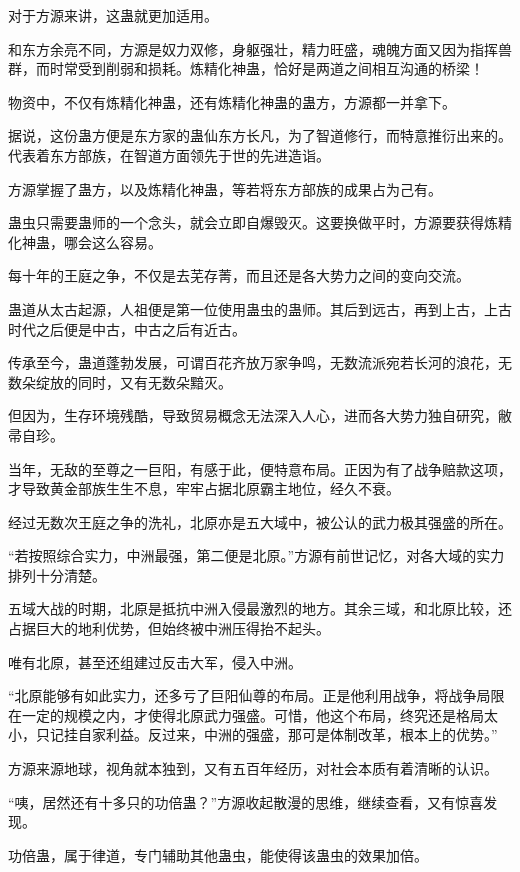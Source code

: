 \begin{this_body}
对于方源来讲，这蛊就更加适用。

和东方余亮不同，方源是奴力双修，身躯强壮，精力旺盛，魂魄方面又因为指挥兽群，而时常受到削弱和损耗。炼精化神蛊，恰好是两道之间相互沟通的桥梁！

物资中，不仅有炼精化神蛊，还有炼精化神蛊的蛊方，方源都一并拿下。

据说，这份蛊方便是东方家的蛊仙东方长凡，为了智道修行，而特意推衍出来的。代表着东方部族，在智道方面领先于世的先进造诣。

方源掌握了蛊方，以及炼精化神蛊，等若将东方部族的成果占为己有。

蛊虫只需要蛊师的一个念头，就会立即自爆毁灭。这要换做平时，方源要获得炼精化神蛊，哪会这么容易。

每十年的王庭之争，不仅是去芜存菁，而且还是各大势力之间的变向交流。

蛊道从太古起源，人祖便是第一位使用蛊虫的蛊师。其后到远古，再到上古，上古时代之后便是中古，中古之后有近古。

传承至今，蛊道蓬勃发展，可谓百花齐放万家争鸣，无数流派宛若长河的浪花，无数朵绽放的同时，又有无数朵黯灭。

但因为，生存环境残酷，导致贸易概念无法深入人心，进而各大势力独自研究，敝帚自珍。

当年，无敌的至尊之一巨阳，有感于此，便特意布局。正因为有了战争赔款这项，才导致黄金部族生生不息，牢牢占据北原霸主地位，经久不衰。

经过无数次王庭之争的洗礼，北原亦是五大域中，被公认的武力极其强盛的所在。

“若按照综合实力，中洲最强，第二便是北原。”方源有前世记忆，对各大域的实力排列十分清楚。

五域大战的时期，北原是抵抗中洲入侵最激烈的地方。其余三域，和北原比较，还占据巨大的地利优势，但始终被中洲压得抬不起头。

唯有北原，甚至还组建过反击大军，侵入中洲。

“北原能够有如此实力，还多亏了巨阳仙尊的布局。正是他利用战争，将战争局限在一定的规模之内，才使得北原武力强盛。可惜，他这个布局，终究还是格局太小，只记挂自家利益。反过来，中洲的强盛，那可是体制改革，根本上的优势。”

方源来源地球，视角就本独到，又有五百年经历，对社会本质有着清晰的认识。

“咦，居然还有十多只的功倍蛊？”方源收起散漫的思维，继续查看，又有惊喜发现。

功倍蛊，属于律道，专门辅助其他蛊虫，能使得该蛊虫的效果加倍。


\end{this_body}
